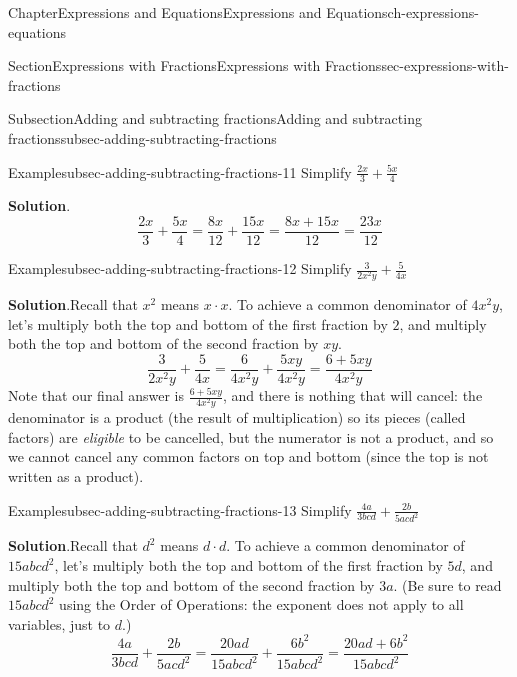 \documentclass[twoside,11pt,]{book}
\newcommand{\blocktitlefont}{\relax}
\numberwithin{equation}{chapter}
\begin{document}
\begin{chapterptx}{Chapter}{Expressions and Equations}{}{Expressions and Equations}{}{}{ch-expressions-equations}
\begin{sectionptx}{Section}{Expressions with Fractions}{}{Expressions with Fractions}{}{}{sec-expressions-with-fractions}
\begin{subsectionptx}{Subsection}{Adding and subtracting fractions}{}{Adding and subtracting fractions}{}{}{subsec-adding-subtracting-fractions}
\begin{example}{Example}{}{subsec-adding-subtracting-fractions-11}%
Simplify \(\frac{2x}{3} + \frac{5x}{4}\)%
\par\smallskip%
\noindent\textbf{\blocktitlefont Solution}.\hypertarget{subsec-adding-subtracting-fractions-11-2}{}\quad{}%
\begin{equation*}
\frac{2x}{3} + \frac{5x}{4} = \frac{8x}{12} + \frac{15x}{12} = \frac{8x+15x}{12} = \frac{23x}{12}
\end{equation*}
%
\end{example}
\begin{example}{Example}{}{subsec-adding-subtracting-fractions-12}%
Simplify \(\frac{3}{2x^2y} + \frac{5}{4x}\)%
\par\smallskip%
\noindent\textbf{\blocktitlefont Solution}.\hypertarget{subsec-adding-subtracting-fractions-12-2}{}\quad{}Recall that \(x^2\) means \(x \cdot x\). To achieve a common denominator of \(4x^2y\), let's multiply both the top and bottom of the first fraction by \(2\), and multiply both the top and bottom of the second fraction by \(xy\).%
\begin{equation*}
\frac{3}{2x^2y} + \frac{5}{4x} = \frac{6}{4x^2y} + \frac{5xy}{4x^2y} = \frac{6+5xy}{4x^2y}
\end{equation*}
Note that our final answer is \(\frac{6+5xy}{4x^2y}\), and there is nothing that will cancel: the denominator is a product (the result of multiplication) so its pieces (called factors) are \emph{eligible} to be cancelled, but the numerator is not a product, and so we cannot cancel any common factors on top and bottom (since the top is not written as a product).%
\end{example}
\begin{example}{Example}{}{subsec-adding-subtracting-fractions-13}%
Simplify \(\frac{4a}{3bcd} + \frac{2b}{5acd^2}\)%
\par\smallskip%
\noindent\textbf{\blocktitlefont Solution}.\hypertarget{subsec-adding-subtracting-fractions-13-2}{}\quad{}Recall that \(d^2\) means \(d \cdot d\). To achieve a common denominator of \(15abcd^2\), let's multiply both the top and bottom of the first fraction by \(5d\), and multiply both the top and bottom of the second fraction by \(3a\). (Be sure to read \(15abcd^2\) using the Order of Operations: the exponent does not apply to all variables, just to \(d\).)%
\begin{equation*}
\frac{4a}{3bcd} + \frac{2b}{5acd^2} = \frac{20ad}{15abcd^2} + \frac{6b^2}{15abcd^2} = \frac{20ad + 6b^2}{15abcd^2}

\end{equation*}
\end{example}
\end{subsectionptx}
\end{sectionptx}
\end{chapterptx}
\end{document}
